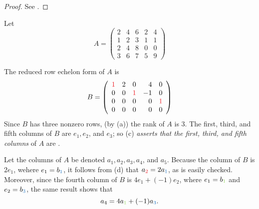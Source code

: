 \begin{proof}
See .
\end{proof}

\begin{example} \label{example 3.4.2}
Let
\[
    A = \left(\begin{array}{ccccc}
        2 & 4 & 6 & 2 & 4 \\
        1 & 2 & 3 & 1 & 1 \\
        2 & 4 & 8 & 0 & 0 \\
        3 & 6 & 7 & 5 & 9
    \end{array}\right)
\]

The reduced row echelon form of \(A\) is
\[
    B=\left(\begin{array}{rrrrr}
        \RED{1} & 2 & 0 & 4 & 0 \\
        0 & 0 & \RED{1} & -1 & 0 \\
        0 & 0 & 0 & 0 & \RED{1} \\
        0 & 0 & 0 & 0 & 0
    \end{array}\right)
\]
Since \(B\) has three nonzero rows, (by (a)) the rank of \(A\) is \(3\).
The first, third, and fifth columns of \(B\) are \(e_1, e_2\), and \(e_3\);
so (c) \emph{asserts that the first, third, and fifth columns} of \(A\) are \LID{}.

Let the columns of \(A\) be denoted \(a_1, a_2, a_3, a_4\), and \(a_5\).
Because the  column of \(B\) is \(2 e_{1}\), wehere \(e_{1} = b_{\BLUE{1}}\), it follows from (d) that \(a_{\RED{2}} = 2 a_{\BLUE{1}}\), as is easily checked.
Moreover, since the fourth column of \(B\) is \(4 e_1 + (-1) e_2\), where \(e_1 = b_{\GREEN{1}}\) and \(e_2 = b_{\BLUE{3}}\), the same result shows that
\[
    a_4 = 4 a_{\GREEN{1}} + (-1) a_{\BLUE{3}}.
\]
\end{example}

